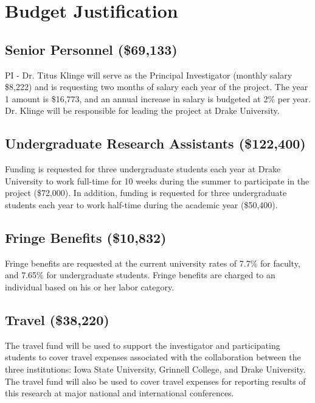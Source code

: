 \documentclass[11pt]{article}
\begin{document}



\section*{Budget Justification}

	\subsection*{Senior Personnel (\$69,133)}
	PI - Dr. Titus Klinge will serve as the Principal Investigator (monthly salary \$8,222) and is requesting two months of salary each year of the project.  The year 1 amount is \$16,773, and an annual increase in salary is budgeted at 2\% per year.  Dr. Klinge will be responsible for leading the project at Drake University.
	
	\subsection*{Undergraduate Research Assistants (\$122,400)}
	Funding is requested for three undergraduate students each year at Drake University to work full-time for 10 weeks during the summer to participate in the project (\$72,000). In addition, funding is requested for three undergraduate students each year to work half-time during the academic year (\$50,400).

	\subsection*{Fringe Benefits (\$10,832)}
	Fringe benefits are requested at the current university rates of 7.7\% for faculty, and 7.65\% for undergraduate students.  Fringe benefits are charged to an individual based on his or her labor category.
	
	\subsection*{Travel (\$38,220)}
	The travel fund will be used to support the investigator and participating students to cover travel expenses associated with the collaboration between the three institutions:  Iowa State University, Grinnell College, and Drake University.  The travel fund will also be used to cover travel expenses for reporting results of this research at major national and international conferences.
\end{document}
